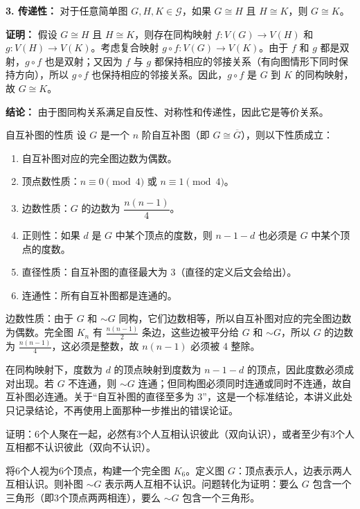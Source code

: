 \textbf{3. 传递性：} 对于任意简单图 $G, H, K \in \mathcal{G}$，如果 $G \cong H$ 且 $H \cong K$，则 $G \cong K$。

\textbf{证明：}
假设 $G \cong H$ 且 $H \cong K$，则存在同构映射 $f: V(G) \to V(H)$ 和 $g: V(H) \to V(K)$。考虑复合映射 $g \circ f: V(G) \to V(K)$。由于 $f$ 和 $g$ 都是双射，$g \circ f$ 也是双射；又因为 $f$ 与 $g$ 都保持相应的邻接关系（有向图情形下同时保持方向），所以 $g \circ f$ 也保持相应的邻接关系。因此，$g \circ f$ 是 $G$ 到 $K$ 的同构映射，故 $G \cong K$。

\textbf{结论：}
由于图同构关系满足自反性、对称性和传递性，因此它是等价关系。
\begin{theorem}{自互补图的性质}{}
设 $G$ 是一个 $n$ 阶自互补图（即 $G \cong \overline{G}$），则以下性质成立：
\begin{enumerate}[itemsep=2pt, parsep=2pt, topsep=5pt, label=(\arabic*)]
    \item 自互补图对应的完全图边数为偶数。
    \item 顶点数性质：$n \equiv 0 \pmod{4}$ 或 $n \equiv 1 \pmod{4}$。
    \item 边数性质：$G$ 的边数为 $\dfrac{n(n-1)}{4}$。
    \item 正则性：如果 $d$ 是 $G$ 中某个顶点的度数，则 $n-1-d$ 也必须是 $G$ 中某个顶点的度数。
    \item 直径性质：自互补图的直径最大为 3（直径的定义后文会给出）。
    \item 连通性：所有自互补图都是连通的。
\end{enumerate}
\end{theorem}
边数性质：由于 $G$ 和 $\sim G$ 同构，它们边数相等，所以自互补图对应的完全图边数为偶数。完全图 $K_n$ 有 $\frac{n(n-1)}{2}$ 条边，这些边被平分给 $G$ 和 $\sim G$，所以 $G$ 的边数为 $\frac{n(n-1)}{4}$，这必须是整数，故 $n(n-1)$ 必须被 4 整除。

在同构映射下，度数为 $d$ 的顶点映射到度数为 $n-1-d$ 的顶点，因此度数必须成对出现。若 $G$ 不连通，则 $\sim G$ 连通；但同构图必须同时连通或同时不连通，故自互补图必连通。关于“自互补图的直径至多为 3”，这是一个标准结论，本讲义此处只记录结论，不再使用上面那种一步推出的错误论证。
\begin{example}{}{}
    证明：6个人聚在一起，必然有3个人互相认识彼此（双向认识），或者至少有3个人互相都不认识彼此（双向不认识）。
\end{example}
将6个人视为6个顶点，构建一个完全图 $K_6$。定义图 $G$：顶点表示人，边表示两人互相认识。则补图 $\sim G$ 表示两人互相不认识。问题转化为证明：要么 $G$ 包含一个三角形（即3个顶点两两相连），要么 $\sim G$ 包含一个三角形。

